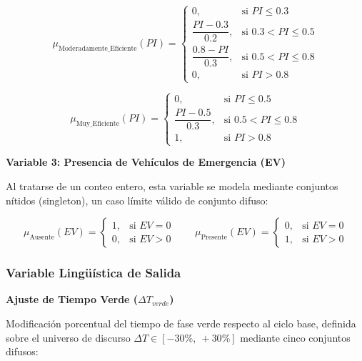 \documentclass[12pt,a4paper,oneside]{report}
\begin{document}
\begin{equation}
\mu_{\text{Moderadamente\_Eficiente}}(PI) =
\begin{cases}
0, & \text{si } PI \leq 0.3\\[3pt]
\dfrac{PI - 0.3}{0.2}, & \text{si } 0.3 < PI \leq 0.5\\[6pt]
\dfrac{0.8 - PI}{0.3}, & \text{si } 0.5 < PI \leq 0.8\\[6pt]
0, & \text{si } PI > 0.8
\end{cases}
\label{eq:mu-pi-mod}
\end{equation}

\begin{equation}
\mu_{\text{Muy\_Eficiente}}(PI) =
\begin{cases}
0, & \text{si } PI \leq 0.5\\[3pt]
\dfrac{PI - 0.5}{0.3}, & \text{si } 0.5 < PI \leq 0.8\\[6pt]
1, & \text{si } PI > 0.8
\end{cases}
\label{eq:mu-pi-muyef}
\end{equation}

\textbf{Variable 3: Presencia de Vehículos de Emergencia (EV)}

Al tratarse de un conteo entero, esta variable se modela mediante conjuntos nítidos (singleton), un caso límite válido de conjunto difuso:

\begin{equation}
\mu_{\text{Ausente}}(EV) =
\begin{cases}
1, & \text{si } EV = 0\\[2pt]
0, & \text{si } EV > 0
\end{cases}
\qquad
\mu_{\text{Presente}}(EV) =
\begin{cases}
0, & \text{si } EV = 0\\[2pt]
1, & \text{si } EV > 0
\end{cases}
\label{eq:mu-ev}
\end{equation}

\subsubsection{Variable Lingüística de Salida}

\textbf{Ajuste de Tiempo Verde (\(\Delta T_{verde}\))}

Modificación porcentual del tiempo de fase verde respecto al ciclo base, definida sobre el universo de discurso \(\Delta T \in [-30\%,\ +30\%]\) mediante cinco conjuntos difusos:
\end{document}
